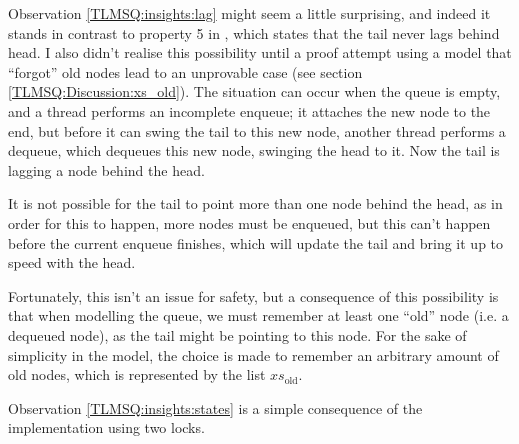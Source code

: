 \documentclass[a4paper, 10pt]{report}
\theoremstyle{definition}
\newcommand{\xsold}{xs_{\mathrm{old}}}
\begin{document}
Observation \ref{TLMSQ:insights:lag} might seem a little surprising, and indeed it stands in contrast to property 5 in \cite{DBLP:conf/podc/MichaelS96}, which states that the tail never lags behind head. I also didn't realise this possibility until a proof attempt using a model that ``forgot'' old nodes lead to an unprovable case (see section \ref{TLMSQ:Discussion:xs_old}). The situation can occur when the queue is empty, and a thread performs an incomplete enqueue; it attaches the new node to the end, but before it can swing the tail to this new node, another thread performs a dequeue, which dequeues this new node, swinging the head to it. Now the tail is lagging a node behind the head.

It is not possible for the tail to point more than one node behind the head, as in order for this to happen, more nodes must be enqueued, but this can't happen before the current enqueue finishes, which will update the tail and bring it up to speed with the head.

Fortunately, this isn't an issue for safety, but a consequence of this possibility is that when modelling the queue, we must remember at least one ``old'' node (i.e. a dequeued node), as the tail might be pointing to this node. For the sake of simplicity in the model, the choice is made to remember an arbitrary amount of old nodes, which is represented by the list $\xsold$.

Observation \ref{TLMSQ:insights:states} is a simple consequence of the implementation using two locks.
\end{document}
